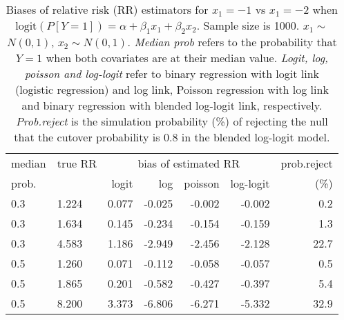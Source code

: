 \documentclass[12pt,a4paper]{article}
\begin{document}
\begin{table}[H] 
\small\sf\centering 
\caption{Biases of relative risk (RR) estimators for $x_1=-1$ vs $x_1=-2$ when $\mbox{logit}(P[Y=1])=\alpha+\beta_1 x_1 + \beta_2 x_2$. Sample size is 1000. $x_1 \sim $$N(0,1)$, $x_2 \sim N(0,1)$. {\it Median prob} refers to the probability that $Y=1$ when both covariates are at their median value. {\it Logit, log, poisson and log-logit} refer to binary regression with logit link (logistic regression) and log link, Poisson regression with log link and binary regression with blended log-logit link, respectively. {\it Prob.reject} is the simulation probability (\%) of rejecting the null that the cutover probability is $0.8$ in the blended log-logit model.} 
\begin{tabular}{llrrrrr} 
\toprule 
median & true RR & \multicolumn{4}{c}{bias of estimated RR} & prob.reject \\ 
prob. & & logit & log & poisson & log-logit  & (\%) \\ \midrule 
0.3 & 1.224 & 0.077 & -0.025 & -0.002 & -0.002 &  0.2 \\  
0.3 & 1.634 & 0.145 & -0.234 & -0.154 & -0.159 &  1.3 \\  
0.3 & 4.583 & 1.186 & -2.949 & -2.456 & -2.128 & 22.7 \\  
0.5 & 1.260 & 0.071 & -0.112 & -0.058 & -0.057 &  0.5 \\  
0.5 & 1.865 & 0.201 & -0.582 & -0.427 & -0.397 &  5.4 \\  
0.5 & 8.200 & 3.373 & -6.806 & -6.271 & -5.332 & 32.9 \\  
\bottomrule 
\end{tabular} 
\end{table} 
\end{document}
